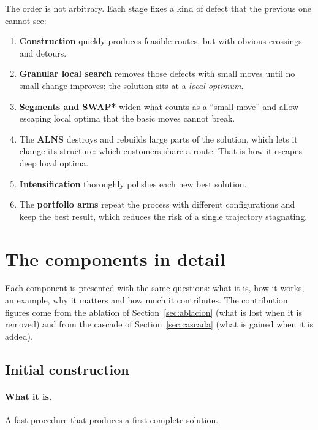 \documentclass[11pt,a4paper]{article}
\begin{document}
The order is not arbitrary. Each stage fixes a kind of defect that the previous one cannot see:

\begin{enumerate}[leftmargin=1.5em]
\item \textbf{Construction} quickly produces feasible routes, but with obvious crossings and detours.
\item \textbf{Granular local search} removes those defects with small moves until no small change
improves: the solution sits at a \emph{local optimum}.
\item \textbf{Segments and SWAP*} widen what counts as a ``small move'' and allow escaping local
optima that the basic moves cannot break.
\item The \textbf{ALNS} destroys and rebuilds large parts of the solution, which lets it change its
structure: which customers share a route. That is how it escapes deep local optima.
\item \textbf{Intensification} thoroughly polishes each new best solution.
\item The \textbf{portfolio arms} repeat the process with different configurations and keep the best
result, which reduces the risk of a single trajectory stagnating.
\end{enumerate}

\section{The components in detail}
\label{sec:componentes}

Each component is presented with the same questions: what it is, how it works, an example, why it
matters and how much it contributes. The contribution figures come from the ablation of
Section~\ref{sec:ablacion} (what is lost when it is removed) and from the cascade of
Section~\ref{sec:cascada} (what is gained when it is added).

\subsection{Initial construction}
\label{sec:construccion}

\paragraph{What it is.} A fast procedure that produces a first complete solution.
\end{document}
